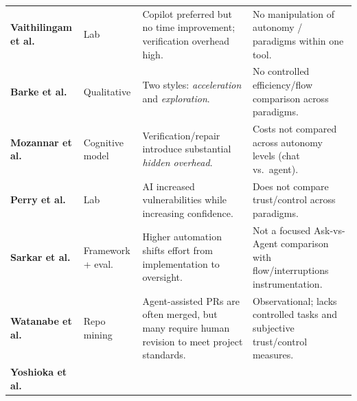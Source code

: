 \begin{table}[H]
\begin{tabularx}{\textwidth}{>{\raggedright\arraybackslash}p{2.8cm} >{\raggedright\arraybackslash}p{2cm} X >{\raggedright\arraybackslash}p{4cm}}
    \textbf{Vaithilingam et al.} \parencite{vaithilingam2022expectation} &

    Lab &

    Copilot preferred but no time improvement; verification overhead high. &

    No manipulation of autonomy / paradigms within one tool. \\

    \textbf{Barke et al.} \parencite{barke2023groundedcopilot} &

    Qualitative &

    Two styles: \emph{acceleration} and \emph{exploration}. &

    No controlled efficiency/flow comparison across paradigms. \\

    \textbf{Mozannar et al.} \parencite{mozannar2024reading} &

    Cognitive model &

    Verification/repair introduce substantial \emph{hidden overhead}. &

    Costs not compared across autonomy levels (chat vs.\ agent). \\

    \textbf{Perry et al.} \parencite{perry2023insecure} &

    Lab &

    AI increased vulnerabilities while increasing confidence. &

    Does not compare trust/control across paradigms. \\

    \textbf{Sarkar et al.} \parencite{sarkar2025codewithme} &

    Framework + eval. &

    Higher automation shifts effort from implementation to oversight. &

    Not a focused Ask-vs-Agent comparison with flow/interruptions instrumentation. \\

    \textbf{Watanabe et al.} \parencite{watanabe2025agenticPR} &

    Repo mining &

    Agent-assisted PRs are often merged, but many require human revision to meet project standards. &

    Observational; lacks controlled tasks and subjective trust/control measures. \\

    \textbf{Yoshioka et al.} \parencite{yoshioka2026meaningfulPR} &


\end{tabularx}
\end{table}
